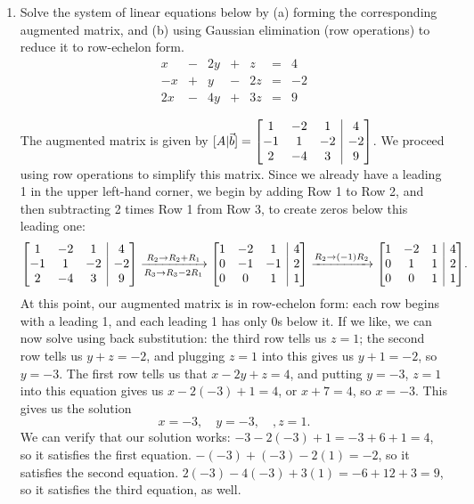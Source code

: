 \documentclass[12pt]{article}
\makeatletter
\newenvironment{amatrix}[1]{%
  \left[\begin{array}{@{}*{#1}{c}|c@{}}
}{%
  \end{array}\right]
}
\newcommand{\bam}{\begin{amatrix}}
\newcommand{\eam}{\end{amatrix}}
\makeatother
\begin{document}
\thispagestyle{fancy}

 \begin{enumerate}
 \item Solve the system of linear equations below by (a) forming the corresponding augmented matrix, and (b) using Gaussian elimination (row operations) to reduce it to row-echelon form.
\[
 \begin{array}{ccccccc}
  x&-&2y&+&z&=&4\\
 -x&+&y&-&2z&=&-2\\
 2x&-&4y&+&3z&=&9
 \end{array}
\]

\bigskip

The augmented matrix is given by $[A|\vec{b}] = \bam{3}1&-2&1&4\\-1&1&-2&-2\\2&-4&3&9\eam$. We proceed using row operations to simplify this matrix. Since we already have a leading 1 in the upper left-hand corner, we begin by adding Row 1 to Row 2, and then subtracting 2 times Row 1 from Row 3, to create zeros below this leading one:
\[
 \bam{3}1&-2&1&4\\-1&1&-2&-2\\2&-4&3&9\eam  \xrightarrow[R_3\to R_3-2R_1]{R_2\to R_2+R_1} \bam{3}1&-2&1&4\\0&-1&-1&2\\0&0&1&1\eam \xrightarrow[]{R_2 \to (-1)R_2} \bam{3}1&-2&1&4\\0&1&1&2\\0&0&1&1\eam.
\]
At this point, our augmented matrix is in row-echelon form: each row begins with a leading 1, and each leading 1 has only 0s below it. If we like, we can now solve using back substitution: the third row tells us $z=1$; the second row tells us $y+z=-2$, and plugging $z=1$ into this gives us $y+1=-2$, so $y=-3$. The first row tells us that $x-2y+z=4$, and putting $y=-3$, $z=1$ into this equation gives us $x-2(-3)+1=4$, or $x+7=4$, so $x=-3$. This gives us the solution
\[
 x=-3,\quad y=-3, \quad, z=1.
\]
We can verify that our solution works: $-3-2(-3)+1 = -3+6+1 = 4$, so it satisfies the first equation. $-(-3)+(-3)-2(1) = -2$, so it satisfies the second equation. $2(-3)-4(-3)+3(1) = -6+12+3 = 9$, so it satisfies the third equation, as well.

\bigskip


\end{enumerate}
\end{document}
